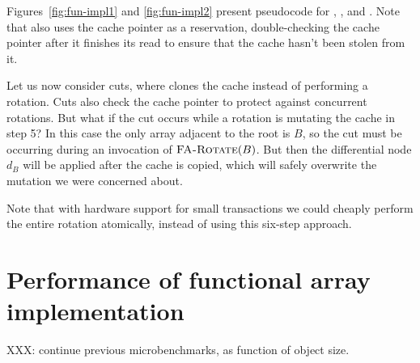 Figures~\ref{fig:fun-impl1} and \ref{fig:fun-impl2} present pseudocode
for , , and
.  Note that  also uses the
cache pointer as a reservation, double-checking the cache pointer
after it finishes its read to ensure that the cache hasn't been stolen
from it.

Let us now consider cuts, where  clones the cache
instead of performing a rotation.   Cuts also check the cache pointer
to protect against concurrent rotations.  But what if the cut occurs
while a rotation is mutating the cache in step 5?  In this case the
only array adjacent to the root is $B$, so the cut must be occurring
during an invocation of $\text{\sc FA-Rotate}(B)$.  But then the
differential node $d_B$ will be applied after the cache is copied,
which will safely overwrite the mutation we were concerned about.

Note that with hardware support for small transactions \cite{HerlihyMo93}
we could cheaply perform the entire rotation atomically, instead of
using this six-step approach.






\section{Performance of functional array implementation}

XXX: continue previous microbenchmarks, as function of object size.



